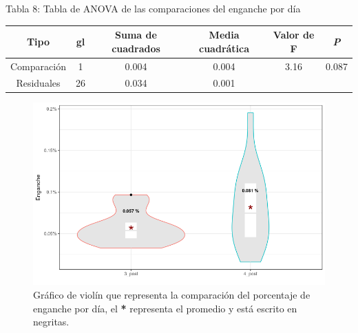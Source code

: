 \documentclass[a4paper,10pt]{article}
\begin{document}
\begin{center}
 \caption{Tabla 8: Tabla de ANOVA  de las comparaciones del enganche por día}
 {\footnotesize
 \begin{tabular}{c|c|c|c|c|c}
 \hline
 Tipo & gl & Suma de cuadrados & Media cuadrática & Valor de F & \textit{P} \\
 \hline
 Comparación & 1 & 0.004 & 0.004 & 3.16 & 0.087 \\
 Residuales & 26 & 0.034 & 0.001 & & \\
 \hline
 \end{tabular}
 }
\end{center}

\begin{figure}[H]
 \begin{center}
  \includegraphics[width = .75\textwidth]{imagenes/graficas/comparacion7.png}
  \caption{Gráfico de violín que representa la comparación del porcentaje de enganche por día,
  el \textbf{*} representa el promedio y está escrito en negritas.}
 \end{center}
\end{figure}
\end{document}
